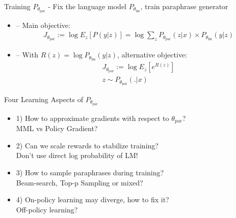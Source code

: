 \documentclass{beamer}
\begin{document}
\begin{frame}{Training $P_{\theta_{\text{par}}}$}
- Fix the language model $P_{\theta_{\text{lm}}}$, train paraphrase generator
\begin{itemize}
    \item -- Main objective:
    \begin{multline}
J_{\theta_{\text{par}}} := \log E_{z} [P(y | z)] = \log \sum_{z} P_{\theta_{\text{par}}}(z | x) \times P_{\theta_{\text{lm}}}(y | z)
\label{lmfp-main-objective}
\end{multline}

    \medskip
    \medskip

    \item -- With $R(z) = \log P_{\theta_{\text{lm}}} (y | z)$, alternative objective:\\
    \begin{multline}
J_{\theta_{\text{par}}}
:= \log E_{z} [e^{R(z)}] \\
z \sim P_{\theta_{\text{par}}}(.|x)
\label{lmfp-expect-objective}
\end{multline}

\end{itemize}
\end{frame}

\begin{frame}{Four Learning Aspects of $P_{\theta_{\text{par}}}$}
\begin{itemize}
    \item 1) How to approximate gradients with respect to $\theta_{\text{par}}$? \\
    {\color{brown}MML vs Policy Gradient?}
    \medskip
    \medskip
    \item 2) Can we scale rewards to stabilize training? \\
    {\color{brown}Don't use direct log probability of LM!}
    \medskip
    \medskip
    \item 3) How to sample paraphrases during training? \\
    {\color{brown}Beam-search, Top-p Sampling or mixed?}
    \medskip
    \medskip
    \item 4) On-policy learning may diverge, how to fix it? \\
    {\color{brown}Off-policy learning?}
    
\end{itemize}
\end{frame}
\end{document}
